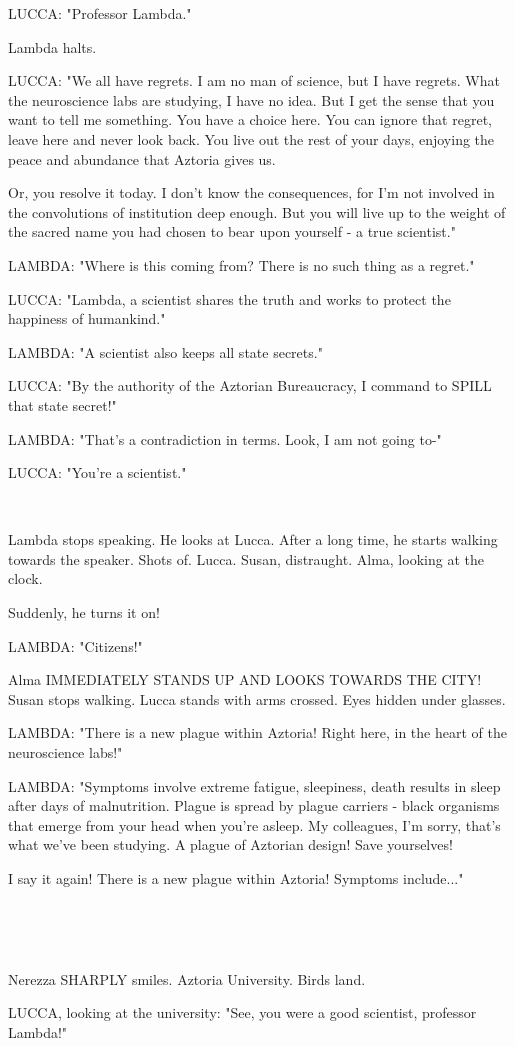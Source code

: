 \documentclass[11pt]{article}
\begin{document}
LUCCA: "Professor Lambda."

Lambda halts.

LUCCA: "We all have regrets.
I am no man of science, but I have regrets.
What the neuroscience labs are studying, I have no idea.
But I get the sense that you want to tell me something.
You have a choice here.
You can ignore that regret, leave here and never look back.
You live out the rest of your days, enjoying the peace and abundance that Aztoria gives us.

Or, you resolve it today.
I don't know the consequences, for I'm not involved in the convolutions of institution deep enough.
But you will live up to the weight of the sacred name you had chosen to bear upon yourself - a true scientist."

LAMBDA: "Where is this coming from? There is no such thing as a regret."

LUCCA: "Lambda, a scientist shares the truth and works to protect the happiness of humankind."

LAMBDA: "A scientist also keeps all state secrets."

LUCCA: "By the authority of the Aztorian Bureaucracy, I command to SPILL that state secret!"

LAMBDA: "That's a contradiction in terms. 
Look, I am not going to-"

LUCCA: "You're a scientist."

\ 

Lambda stops speaking. 
He looks at Lucca.
After a long time, he starts walking towards the speaker. 
Shots of.
Lucca.
Susan, distraught.
Alma, looking at the clock.

Suddenly, he turns it on!

LAMBDA: "Citizens!"

Alma IMMEDIATELY STANDS UP AND LOOKS TOWARDS THE CITY!
Susan stops walking.
Lucca stands with arms crossed. Eyes hidden under glasses.

LAMBDA: "There is a new plague within Aztoria! 
Right here, in the heart of the neuroscience labs!"

LAMBDA: "Symptoms involve extreme fatigue, sleepiness, death results in sleep after days of malnutrition.
Plague is spread by plague carriers - black organisms that emerge from your head when you're asleep.
My colleagues, I'm sorry, that's what we've been studying. 
A plague of Aztorian design!
Save yourselves! 

I say it again!
There is a new plague within Aztoria! 
Symptoms include..."

\ 

\ 

Nerezza SHARPLY smiles.
Aztoria University.
Birds land.

LUCCA, looking at the university: "See, you were a good scientist, professor Lambda!"
\end{document}
